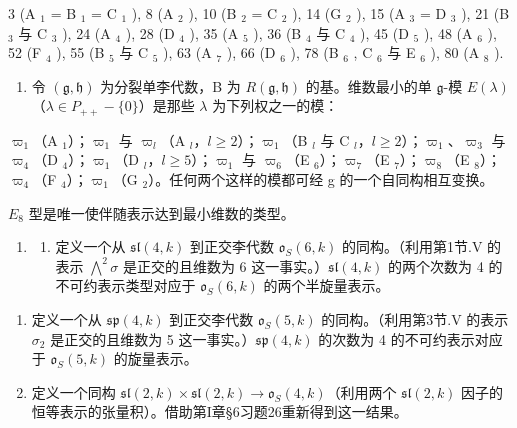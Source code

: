 3 (A \(_{1}\) = B \(_{1}\) = C \(_{1}\) ), 8 (A \(_{2}\) ), 10 (B \(_{2}\) = C \(_{2}\) ), 14 (G \(_{2}\) ), 15 (A \(_{3}\) = D \(_{3}\) ), 21 (B \(_{3}\) 与 C \(_{3}\) ), 24 (A \(_{4}\) ), 28 (D \(_{4}\) ), 35 (A \(_{5}\) ), 36 (B \(_{4}\) 与 C \(_{4}\) ), 45 (D \(_{5}\) ), 48 (A \(_{6}\) ), 52 (F \(_{4}\) ), 55 (B \(_{5}\) 与 C \(_{5}\) ), 63 (A \(_{7}\) ), 66 (D \(_{6}\) ), 78 (B \(_{6}\) , C \(_{6}\) 与 E \(_{6}\) ), 80 (A \(_{8}\) ).

\begin{enumerate}
\def\labelenumi{\arabic{enumi})}
\setcounter{enumi}{1}
\tightlist
\item
  令 \((\mathfrak{g},\mathfrak{h})\) 为分裂单李代数，B 为 \(R(\mathfrak{g},\mathfrak{h})\) 的基。维数最小的单 \(\mathfrak{g}\)-模 \(E(\lambda)\)（\(\lambda \in P_{++} - \{0\}\)）是那些 \(\lambda\) 为下列权之一的模：
\end{enumerate}

\(\varpi_{1}\)（A \(_{1}\)）；\(\varpi_{1}\) 与 \(\varpi_{l}\)（A \(_{l}\)，\(l \geq 2\)）；\(\varpi_{1}\)（B \(_{l}\) 与 C \(_{l}\)，\(l \geq 2\)）；\(\varpi_{1}\)、\(\varpi_{3}\) 与 \(\varpi_{4}\)（D \(_{4}\)）；\(\varpi_{1}\)（D \(_{l}\)，\(l \geq 5\)）；\(\varpi_{1}\) 与 \(\varpi_{6}\)（E \(_{6}\)）；\(\varpi_{7}\)（E \(_{7}\)）；\(\varpi_{8}\)（E \(_{8}\)）；\(\varpi_{4}\)（F \(_{4}\)）；\(\varpi_{1}\)（G \(_{2}\)）。任何两个这样的模都可经 g 的一个自同构相互变换。

\(E_{8}\) 型是唯一使伴随表示达到最小维数的类型。

\begin{enumerate}
\def\labelenumi{\arabic{enumi})}
\setcounter{enumi}{2}
\tightlist
\item
  \begin{enumerate}
  \def\labelenumii{\alph{enumii})}
  \tightlist
  \item
    定义一个从 \(\mathfrak{sl}(4,k)\) 到正交李代数 \(\mathfrak{o}_S(6,k)\) 的同构。（利用第1节.V 的表示 \(\bigwedge^2\sigma\) 是正交的且维数为 6 这一事实。）\(\mathfrak{sl}(4,k)\) 的两个次数为 4 的不可约表示类型对应于 \(\mathfrak{o}_S(6,k)\) 的两个半旋量表示。
  \end{enumerate}
\end{enumerate}

\begin{enumerate}
\def\labelenumi{\alph{enumi})}
\setcounter{enumi}{1}
\item
  定义一个从 \(\mathfrak{sp}(4,k)\) 到正交李代数 \(\mathfrak{o}_S(5,k)\) 的同构。（利用第3节.V 的表示 \(\sigma_2\) 是正交的且维数为 5 这一事实。）\(\mathfrak{sp}(4,k)\) 的次数为 4 的不可约表示对应于 \(\mathfrak{o}_S(5,k)\) 的旋量表示。
\item
  定义一个同构 \(\mathfrak{sl}(2,k)\times\mathfrak{sl}(2,k)\to\mathfrak{o}_{S}(4,k)\)（利用两个 \(\mathfrak{sl}(2,k)\) 因子的恒等表示的张量积）。借助第I章§6习题26重新得到这一结果。
\end{enumerate}

